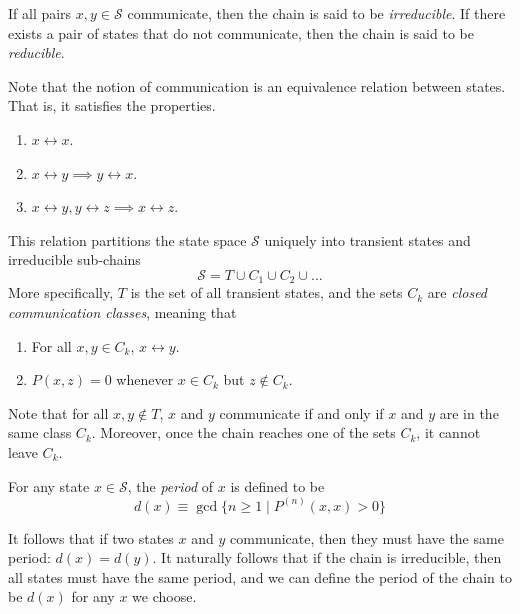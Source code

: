 \documentclass{article}
\begin{document}
    \begin{definition}
      If all pairs $x, y \in \mathcal{S}$ communicate, then the chain is said to be \textit{irreducible}. If there exists a pair of states that do not communicate, then the chain is said to be \textit{reducible}. 
    \end{definition}

    Note that the notion of communication is an equivalence relation between states. That is, it satisfies the properties. 
    \begin{enumerate}
      \item $x \leftrightarrow x$.
      \item $x \leftrightarrow y \implies y \leftrightarrow x$.
      \item $x \leftrightarrow y, y \leftrightarrow z \implies x \leftrightarrow z$.
    \end{enumerate}
    This relation partitions the state space $\mathcal{S}$ uniquely into transient states and irreducible sub-chains
    \begin{equation}
      \mathcal{S} = T \cup C_1 \cup C_2 \cup ...
    \end{equation}
    More specifically, $T$ is the set of all transient states, and the sets $C_k$ are \textit{closed communication classes}, meaning that
    \begin{enumerate}
      \item For all $x, y \in C_k$, $x \leftrightarrow y$. 
      \item $P(x, z) = 0$ whenever $x \in C_k$ but $z \not\in C_k$. 
    \end{enumerate}
    Note that for all $x, y \not\in T$, $x$ and $y$ communicate if and only if $x$ and $y$ are in the same class $C_k$. Moreover, once the chain reaches one of the sets $C_k$, it cannot leave $C_k$. 

    \begin{definition}[Period]
      For any state $x \in \mathcal{S}$, the \textit{period} of $x$ is defined to be
      \begin{equation}
        d(x) \equiv \gcd \{n \geq 1 \; | \; P^{(n)} (x, x) > 0\}
      \end{equation}
    \end{definition}

    \begin{theorem}
      It follows that if two states $x$ and $y$ communicate, then they must have the same period: $d(x) = d(y)$. It naturally follows that if the chain is irreducible, then all states must have the same period, and we can define the period of the chain to be $d(x)$ for any $x$ we choose.
    \end{theorem}
\end{document}
